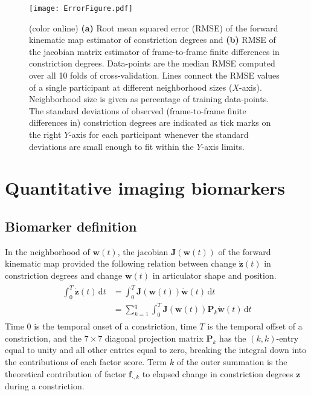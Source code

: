 \documentclass[preprint]{JASAnew}
\begin{document}
\begin{figure*}
\raggedright

\texttt{[image: ErrorFigure.pdf]}

\caption{(color online) 
{\bf (a)} Root mean squared error (RMSE) of the forward kinematic map estimator of constriction degrees and {\bf (b)} RMSE of the jacobian matrix estimator of frame-to-frame finite differences in constriction degrees. 
Data-points are the median RMSE computed over all 10 folds of cross-validation.
Lines connect the RMSE values of a single participant at different neighborhood sizes ($X$-axis).
Neighborhood size is given as percentage of training data-points.
The standard deviations of observed (frame-to-frame finite differences in) constriction degrees are indicated as tick marks on the right $Y$-axis for each participant whenever the standard deviations are small enough to fit within the $Y$-axis limits.}
\label{fig:cverrors}
\end{figure*}




\section{Quantitative imaging biomarkers}
\label{sec:articulator synergy biomarker}

\subsection{Biomarker definition}

In the neighborhood of $\mathbf{w}(t)$, the jacobian $\mathbf{J}(\mathbf{w}(t))$ of the forward kinematic map provided the following relation between change $\mathbf{\dot{z}}(t)$ in constriction degrees and change $\mathbf{\dot{w}}(t)$ in articulator shape and position.
%
\begin{align}
\label{eq:biomarkerderivationcontinuoustime}
\begin{split}
\int_{0}^{T} \mathbf{\dot{z}}(t) \, \mathrm{d}t
	&= \int_{0}^{T} \mathbf{J}\left( \mathbf{w}(t) \right) \mathbf{\dot{w}}(t) \, \mathrm{d}t \\
    &= \sum_{k=1}^q \int_{0}^{T} \mathbf{J}\left( \mathbf{w}(t) \right) \mathbf{P}_k \mathbf{\dot{w}}(t) \, \mathrm{d}t
\end{split}
\end{align}
%
Time $0$ is the temporal onset of a constriction, time $T$ is the temporal offset of a constriction, and the $7\times 7$ diagonal projection matrix $\mathbf{P}_k$ has the $(k,k)$-entry equal to unity and all other entries equal to zero, breaking the integral down into the contributions of each factor score.
Term $k$ of the outer summation is the theoretical contribution of factor $\mathbf{f}_{\cdot,k}$ to elapsed change in constriction degrees $\mathbf{z}$ during a constriction. 
\end{document}
